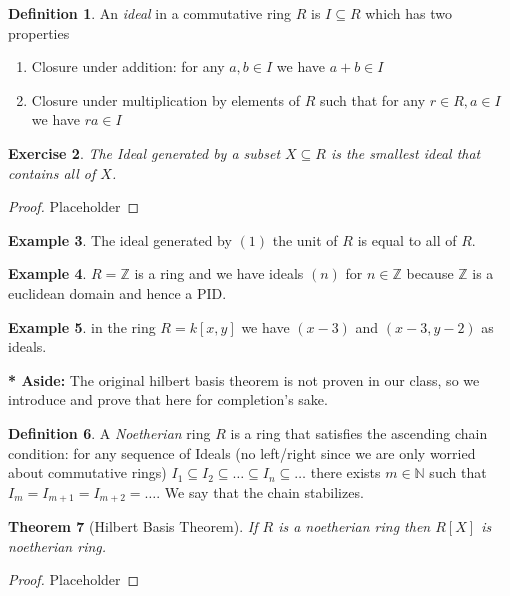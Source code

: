 \documentclass[11pt,a4paper]{article}
\newenvironment{asidebar}{%
    \def\FrameCommand{\vrule width 1.5pt \hspace{8pt}}%
    \MakeFramed{\advance\hsize-\width\FrameRestore}%
}{\endMakeFramed}
\newcommand{\aside}[1]{\begin{asidebar}\noindent\textbf{* Aside:} #1\end{asidebar}}
\theoremstyle{plain}
\newtheorem{theorem}{Theorem}[section]
\newtheorem{exercise}[theorem]{Exercise}
\theoremstyle{definition}
\newtheorem{definition}[theorem]{Definition}
\newtheorem{example}[theorem]{Example}
\theoremstyle{remark}
\begin{document}
\begin{definition}
    An \emph{ideal} in a commutative ring $R$ is $I \subseteq R$ which has two properties \begin{enumerate}
        \item Closure under addition: for any $a,b \in I$ we have $a+b \in I$
        \item Closure under multiplication by elements of $R$ such that for any $r \in R, a \in I$ we have $ra \in I$
    \end{enumerate}
\end{definition}

\begin{exercise}
    The Ideal generated by a subset $X\subseteq R$ is the smallest ideal that contains all of $X$.
\end{exercise}

\begin{proof}
    Placeholder
\end{proof}

\begin{example}
    The ideal generated by $(1)$ the unit of $R$ is equal to all of $R$.
\end{example}

\begin{example}
    $R = \mathbb{Z}$ is a ring and we have ideals $(n)$ for $n \in \mathbb{Z}$ because $\mathbb{Z}$ is a euclidean domain and hence a PID.
\end{example}

\begin{example}
    in the ring $R = k[x,y]$ we have $(x-3)$ and $(x-3,y-2)$ as ideals.
\end{example}

\aside{ The original hilbert basis theorem is not proven in our class, so we introduce and prove that here for completion's sake. 
\begin{definition}
    A \emph{Noetherian} ring $R$ is a ring that satisfies the ascending chain condition: for any sequence of Ideals (no left/right since we are only worried about commutative rings) $I_1 \subseteq I_2 \subseteq \dots \subseteq I_n \subseteq \dots$ there exists $m \in \mathbb{N}$ such that $I_m = I_{m+1} = I_{m+2} = \dots$. We say that the chain stabilizes. 
\end{definition}

\begin{theorem}[Hilbert Basis Theorem]
    If $R$ is a noetherian ring then $R[X]$ is noetherian ring.
\end{theorem}

\begin{proof}
    Placeholder
\end{proof}}
\end{document}
